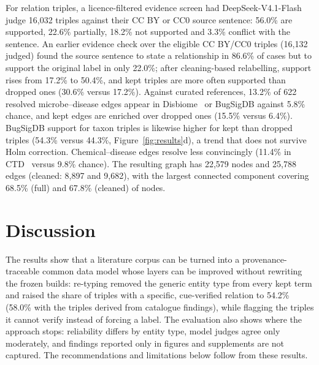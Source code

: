 \documentclass[referee,lineno,pdflatex,sn-vancouver-num]{sn-jnl}
\theoremstyle{thmstyleone}%
\theoremstyle{thmstyletwo}%
\theoremstyle{thmstylethree}%
\begin{document}
For relation triples, a licence-filtered evidence screen had
DeepSeek-V4.1-Flash judge 16{,}032 triples against their CC BY or CC0
source sentence: 56.0\% are supported, 22.6\% partially, 18.2\% not
supported and 3.3\% conflict with the sentence. An earlier evidence
check over the eligible CC BY/CC0 triples (16{,}132 judged) found the
source sentence to state a relationship in 86.6\% of cases but to
support the original label in only 22.0\%; after cleaning-based
relabelling, support rises from 17.2\% to 50.4\%, and kept triples are
more often supported than dropped ones (30.6\% versus 17.2\%).
Against curated references, 13.2\% of 622 resolved microbe--disease
edges appear in Disbiome~\cite{janssens2018disbiome} or BugSigDB
against 5.8\% chance, and kept edges are enriched over dropped ones
(15.5\% versus 6.4\%). BugSigDB support for taxon triples is likewise
higher for kept than dropped triples (54.3\% versus 44.3\%,
Figure~\ref{fig:results}d), a trend that does not survive Holm
correction. Chemical--disease edges resolve less convincingly (11.4\%
in CTD~\cite{davis2026ctd} versus 9.8\% chance). The resulting graph
has 22{,}579 nodes and 25{,}788 edges (cleaned: 8{,}897 and 9{,}682),
with the largest connected component covering 68.5\% (full) and 67.8\%
(cleaned) of nodes.

\section{Discussion}\label{sec:discussion}
The results show that a literature corpus can be turned into a
provenance-traceable common data model whose layers can be improved
without rewriting the frozen builds: re-typing removed the generic entity
type from every kept term and raised the share of triples with a
specific, cue-verified relation to 54.2\% (58.0\% with the triples derived
from catalogue findings), while flagging the triples
it cannot verify instead of forcing a label. The
evaluation also shows where the approach stops: reliability differs by
entity type, model judges agree only moderately, and findings reported
only in figures and supplements are not captured. The recommendations
and limitations below follow from these results.
\end{document}
